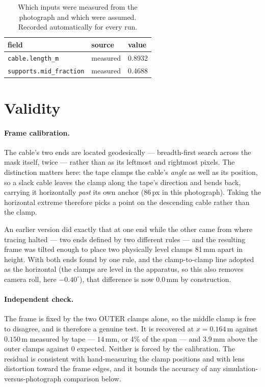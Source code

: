 \documentclass[11pt,a4paper]{article}
\begin{document}
\begin{table}[htbp]
\centering\small
\begin{tabular}{lll}
\toprule
field & source & value \\
\midrule
    \texttt{cable.length\_m} & measured & 0.8932 \\
    \texttt{supports.mid\_fraction} & measured & 0.4688 \\
\bottomrule
\end{tabular}
\caption{Which inputs were measured from the photograph and which were
assumed. Recorded automatically for every run.}
\end{table}

\section{Validity}
\label{sec:validity}

\paragraph{Frame calibration.} The cable's two ends are located
geodesically --- breadth-first search across the mask itself, twice --- rather
than as its leftmost and rightmost pixels. The distinction matters here: the
tape clamps the cable's \emph{angle} as well as its position, so a slack
cable leaves the clamp along the tape's direction and bends back, carrying it
horizontally \emph{past} its own anchor (86\,px in this photograph). Taking
the horizontal extreme therefore picks a point on the descending cable rather
than the clamp.

An earlier version did exactly that at one end while the other came from where
tracing halted --- two ends defined by two different rules --- and the
resulting frame was tilted enough to place two physically level clamps 81\,mm
apart in height. With both ends found by one rule, and the clamp-to-clamp line
adopted as the horizontal (the clamps are level in the apparatus, so this also
removes camera roll, here $-0.40^\circ$), that difference is now $0.0$\,mm by
construction.

\paragraph{Independent check.} The frame is fixed by the two OUTER clamps
alone, so the middle clamp is free to disagree, and is therefore a genuine
test. It is recovered at $x = 0.164$\,m against $0.150$\,m measured by tape ---
$14$\,mm, or 4\% of the span --- and $3.9$\,mm above the outer clamps against
$0$ expected. Neither is forced by the calibration. The residual is consistent
with hand-measuring the clamp positions and with lens distortion toward the
frame edges, and it bounds the accuracy of any
simulation-versus-photograph comparison below.
\end{document}
